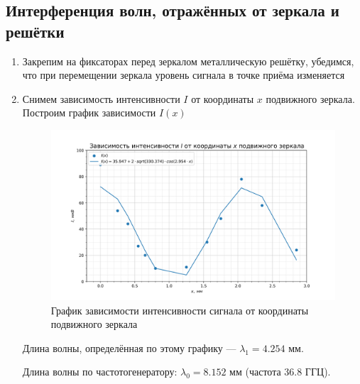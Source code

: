 \documentclass[a4paper, 12pt]{article}
\begin{document}
\newpage

\subsection{Интерференция волн, отражённых от зеркала и решётки}
\begin{enumerate}
    \item Закрепим на фиксаторах перед зеркалом металлическую решётку, убедимся, что при перемещении зеркала уровень сигнала в точке приёма изменяется
    \item Снимем зависимость интенсивности $I$ от координаты $x$ подвижного зеркала. Построим график зависимости $I(x)$
    
\begin{figure}[h!]
    \centering
    \includegraphics[scale=0.7]{4.6.1_2.png}
    \caption{График зависимости интенсивности сигнала от координаты подвижного зеркала}
    \label{fig:intens}
\end{figure}

Длина волны, определённая по этому графику --- $\lambda_1 = 4.254$ мм. \par
Длина волны по частотогенератору: $\lambda_0 = 8.152$ мм (частота 36.8 ГГЦ).
\end{enumerate}

\newpage
\end{document}
